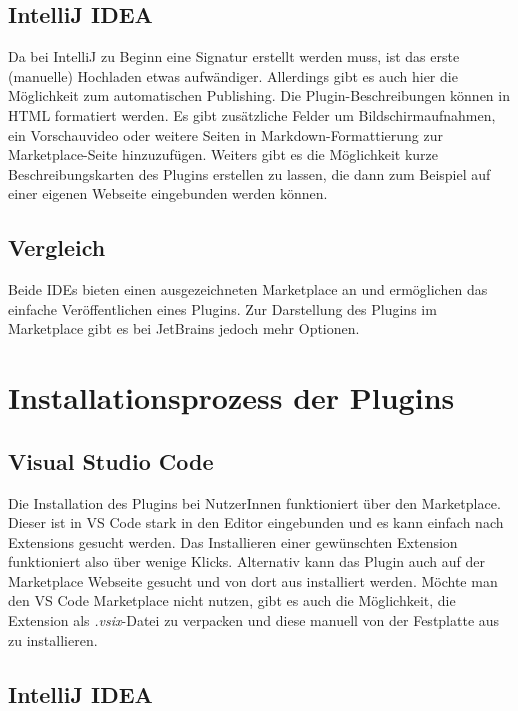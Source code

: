 \subsection{IntelliJ IDEA}

Da bei IntelliJ zu Beginn eine Signatur erstellt werden muss, ist das
erste (manuelle) Hochladen etwas aufwändiger. Allerdings
gibt es auch hier die Möglichkeit zum automatischen Publishing.
Die Plugin-Beschreibungen können in HTML formatiert werden. Es gibt
zusätzliche Felder um Bildschirmaufnahmen, ein Vorschauvideo oder
weitere Seiten in Markdown-Formattierung zur Marketplace-Seite
hinzuzufügen. Weiters gibt es die Möglichkeit kurze Beschreibungskarten
des Plugins erstellen zu lassen, die dann zum Beispiel auf 
einer eigenen Webseite eingebunden werden können.

\subsection{Vergleich}

Beide IDEs bieten einen ausgezeichneten Marketplace an
und ermöglichen das einfache Veröffentlichen eines Plugins.
Zur Darstellung des Plugins im Marketplace gibt es bei JetBrains
jedoch mehr Optionen.


\section{Installationsprozess der Plugins}
\label{sec:Vergleich_Installationsprozess}

\subsection{Visual Studio Code}

Die Installation des Plugins bei NutzerInnen funktioniert
über den Marketplace. Dieser ist in VS Code stark in den 
Editor eingebunden und es kann einfach nach 
Extensions gesucht werden. Das Installieren einer gewünschten
Extension funktioniert also über wenige Klicks.
Alternativ kann das Plugin auch auf der Marketplace Webseite
gesucht und von dort aus installiert werden.
Möchte man den VS Code Marketplace nicht nutzen, gibt es auch
die Möglichkeit, die Extension als \emph{.vsix}-Datei
zu verpacken und diese manuell von der Festplatte aus zu installieren.

\subsection{IntelliJ IDEA}


